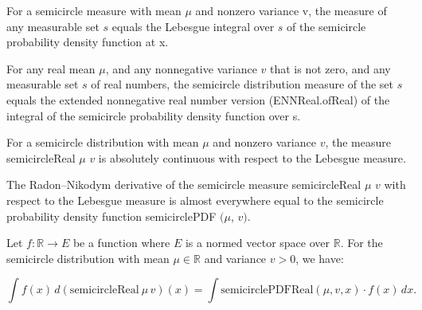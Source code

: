\begin{lemma}
    \label{lemma:semicircleReal_apply}
    \leanok
    For a semicircle measure with mean $\mu$ and nonzero variance v, the measure of any measurable set $s$ equals the Lebesgue integral over $s$ of the semicircle probability density function at x.
\end{lemma}

\begin{lemma}
    \label{lemma:semicircleReal_apply_eq_integral}
    \leanok
    For any real mean $\mu$, and any nonnegative variance $v$ that is not zero, and any measurable set $s$ of real numbers, the semicircle distribution measure of the set $s$ equals the extended nonnegative real number version (ENNReal.ofReal) of the integral of the semicircle probability density function over s.
\end{lemma}

\begin{lemma}
    \label{lemma:semicircleReal_absolutelyContinuous}
    \leanok
    For a semicircle distribution with mean $\mu$ and nonzero variance $v$, the measure semicircleReal $μ$ $v$ is absolutely continuous with respect to the Lebesgue measure.
\end{lemma}

\begin{lemma}
    \label{lemma:rnDeriv_semicircleReal}
    \leanok
    The Radon–Nikodym derivative of the semicircle measure semicircleReal $\mu$ $v$ with respect to the Lebesgue measure is almost everywhere equal to the semicircle probability density function semicirclePDF $(\mu$, $v)$.
\end{lemma}

\begin{lemma} 
    \label{lemma:integral_semicircleReal_eq_integral_smul}
    \leanok

    Let $ f : \mathbb{R} \to E $ be a function where $ E $ is a normed vector space over $\mathbb{R}$. For the semicircle distribution with mean $\mu \in \mathbb{R}$ and variance $ v > 0 $, we have:

    \[
    \int f(x) \, d(\mathrm{semicircleReal}\ \mu\, v)(x) = \int \mathrm{semicirclePDFReal}(\mu, v, x) \cdot f(x) \, dx.
    \]
    
    
\end{lemma}

